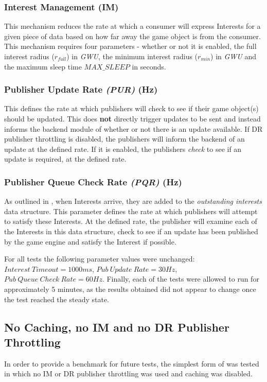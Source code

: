 \subsubsection*{Interest Management (IM)}
This mechanism reduces the rate at which a consumer will express Interests for a given piece of data based on how far away the game object is from the consumer. This mechanism requires four parameters - whether or not it is enabled, the full interest radius ($r_{full}$) in \textit{GWU}, the minimum interest radius ($r_{min}$) in \textit{GWU} and the maximum sleep time $MAX\_SLEEP$ in seconds.

\subsubsection*{Publisher Update Rate \textit{(PUR)} (Hz)}
This defines the rate at which publishers will check to see if their game object(s) should be updated. This does \textbf{not} directly trigger updates to be sent and instead informs the backend module of whether or not there is an update available. If DR publisher throttling is disabled, the publishers will inform the backend of an update at the defined rate. If it is enabled, the publishers \textit{check} to see if an update is required, at the defined rate. 

\subsubsection*{Publisher Queue Check Rate \textit{(PQR)} (Hz)}
As outlined in , when Interests arrive, they are added to the \textit{outstanding interests} data structure. This parameter defines the rate at which publishers will attempt to satisfy these Interests. At the defined rate, the publisher will examine each of the Interests in this data structure, check to see if an update has been published by the game engine and satisfy the Interest if possible. 

For all tests the following parameter values were unchanged: $Interest\ Timeout = 1000ms$, $Pub\ Update\ Rate = 30Hz$, $Pub\ Queue\ Check\ Rate = 60Hz$. Finally, each of the tests were allowed to run for approximately 5 minutes, as the results obtained did not appear to change once the test reached the steady state.



\subsection{No Caching, no IM and no DR Publisher Throttling}
In order to provide a benchmark for future tests, the simplest form of \game{} was tested in which no IM or DR publisher throttling was used and caching was disabled.

